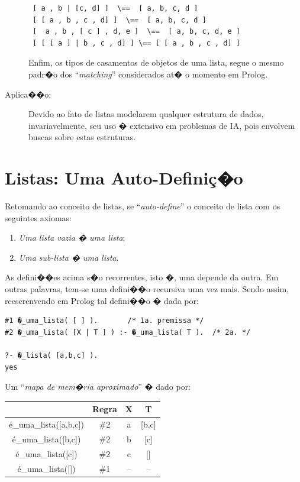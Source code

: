 \documentclass[final,a4paper]{article}
\begin{document}
\begin{description}
\begin{lstlisting}
 [ a , b | [c, d] ]  \==  [ a, b, c, d ]
 [ [ a , b , c , d] ]  \==  [ a, b, c, d ]
 [  a , b , [ c ] , d, e ]  \==  [ a, b, c, d, e ]
 [ [ [ a ] | b , c , d] ] \== [ [ a , b , c , d] ]
\end{lstlisting}
Enfim, os tipos de  casamentos de objetos de uma lista, segue o mesmo padr�o dos ``{\em matching}'' considerados at� o momento
em Prolog.

\item [Aplica��o:]  Devido ao fato de listas modelarem
qualquer estrutura de dados, invariavelmente, seu uso  � extensivo
em problemas de IA, pois envolvem buscas sobre estas estruturas.

\end{description}


\section{Listas: Uma  Auto-Defini\c{c}�o}\label{def_lista}
Retomando ao conceito de listas,
se ``{\em auto-define}''  o conceito de lista com os seguintes axiomas:

\begin{enumerate}
\item   {\em Uma lista vazia � uma lista};
\item   {\em  Uma sub-lista � uma lista}.
\end{enumerate}

As defini��es acima s�o recorrentes, isto �, uma depende da outra. Em outras  palavras, tem-se uma defini��o recursiva uma vez mais. Sendo assim, reescrenvendo em Prolog tal defini��o � dada por:

\begin{verbatim}
#1 �_uma_lista( [ ] ).       /* 1a. premissa */
#2 �_uma_lista( [X | T ] ) :- �_uma_lista( T ).  /* 2a. */

?- �_lista( [a,b,c] ).
yes
\end{verbatim}

Um ``{\em mapa de mem�ria aproximado}'' � dado por:
\begin{center}
\begin{tabular}
[c]{|c|c|c|c|}\hline
& Regra & X & T\\\hline
\'{e}\_uma\_lista([a,b,c]) & \#2 & a & [b,c]\\\hline
\'{e}\_uma\_lista([b,c]) & \#2 & b & [c]\\\hline
\'{e}\_uma\_lista([c]) & \#2 & c & []\\\hline
\'{e}\_uma\_lista([]) & \#1 & -- & --\\\hline
\end{tabular}
\end{center}
\end{document}
